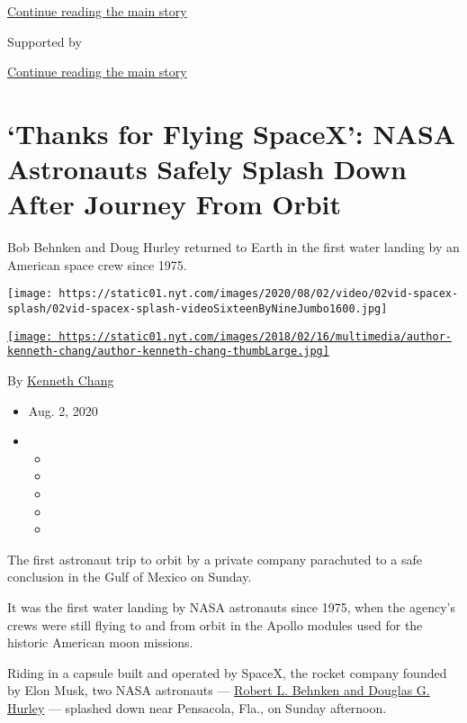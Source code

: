 \protect\hyperlink{after-top}{Continue reading the main story}

Supported by

\protect\hyperlink{after-sponsor}{Continue reading the main story}

\hypertarget{thanks-for-flying-spacex-nasa-astronauts-safely-splash-down-after-journey-from-orbit}{%
\section{`Thanks for Flying SpaceX': NASA Astronauts Safely Splash Down
After Journey From
Orbit}\label{thanks-for-flying-spacex-nasa-astronauts-safely-splash-down-after-journey-from-orbit}}

Bob Behnken and Doug Hurley returned to Earth in the first water landing
by an American space crew since 1975.

\texttt{[image: https://static01.nyt.com/images/2020/08/02/video/02vid-spacex-splash/02vid-spacex-splash-videoSixteenByNineJumbo1600.jpg]}

\href{https://www.nytimes.com/by/kenneth-chang}{\texttt{[image: https://static01.nyt.com/images/2018/02/16/multimedia/author-kenneth-chang/author-kenneth-chang-thumbLarge.jpg]}}

By \href{https://www.nytimes.com/by/kenneth-chang}{Kenneth Chang}

\begin{itemize}
\item
  Aug. 2, 2020
\item
  \begin{itemize}
  \item
  \item
  \item
  \item
  \item
  \end{itemize}
\end{itemize}

The first astronaut trip to orbit by a private company parachuted to a
safe conclusion in the Gulf of Mexico on Sunday.

It was the first water landing by NASA astronauts since 1975, when the
agency's crews were still flying to and from orbit in the Apollo modules
used for the historic American moon missions.

Riding in a capsule built and operated by SpaceX, the rocket company
founded by Elon Musk, two NASA astronauts ---
\href{https://www.nytimes.com/2020/05/27/science/bob-behnken-doug-hurley.html}{Robert
L. Behnken and Douglas G. Hurley} --- splashed down near Pensacola,
Fla., on Sunday afternoon.

